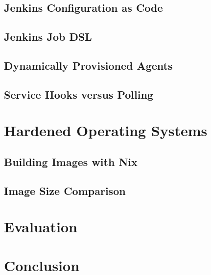 \section{Jenkins Configuration as Code}

\section{Jenkins Job DSL}

\section{Dynamically Provisioned Agents}

\section{Service Hooks versus Polling}

\chapter{Hardened Operating Systems}

\section{Building Images with Nix}

\section{Image Size Comparison}

\chapter{Evaluation}

\chapter{Conclusion}

\cleardoublepage
{}
{}
\printbibliography

